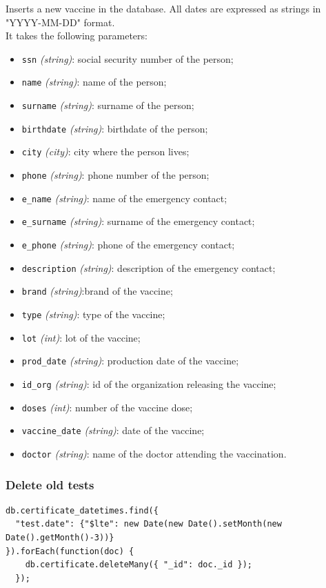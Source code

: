 \documentclass[12pt, a4paper]{article}
\begin{document}
\noindent
Inserts a new vaccine in the database. All dates are expressed as strings
in "YYYY-MM-DD" format. \\
It takes the following parameters:
\begin{itemize}
    \item \texttt{ssn} \emph{(string)}: social security number of the person;
    \item \texttt{name} \emph{(string)}: name of the person;
    \item \texttt{surname} \emph{(string)}: surname of the person;
    \item \texttt{birthdate} \emph{(string)}: birthdate of the person;
    \item \texttt{city} \emph{(city)}: city where the person lives;
    \item \texttt{phone} \emph{(string)}: phone number of the person;
    \item \texttt{e\_name} \emph{(string)}: name of the emergency contact;
    \item \texttt{e\_surname} \emph{(string)}: surname of the emergency contact;
    \item \texttt{e\_phone} \emph{(string)}: phone of the emergency contact;
    \item \texttt{description} \emph{(string)}: description of the emergency contact;
    \item \texttt{brand} \emph{(string)}:brand of the vaccine;
    \item \texttt{type} \emph{(string)}: type of the vaccine;
    \item \texttt{lot} \emph{(int)}: lot of the vaccine;
    \item \texttt{prod\_date} \emph{(string)}: production date of the vaccine;
    \item \texttt{id\_org} \emph{(string)}: id of the organization releasing the vaccine;
    \item \texttt{doses} \emph{(int)}: number of the vaccine dose;
    \item \texttt{vaccine\_date} \emph{(string)}: date of the vaccine;
    \item \texttt{doctor} \emph{(string)}: name of the doctor attending the vaccination.
 \end{itemize}

\subsubsection{Delete old tests}
\begin{tcolorbox}[fontupper=\scriptsize]
    \begin{verbatim}
db.certificate_datetimes.find({ 
  "test.date": {"$lte": new Date(new Date().setMonth(new Date().getMonth()-3))}
}).forEach(function(doc) {
    db.certificate.deleteMany({ "_id": doc._id });
  });
      \end{verbatim}
\end{tcolorbox}
\end{document}
